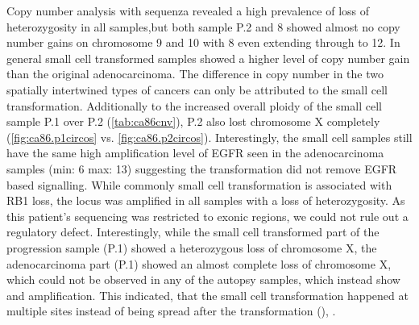 Copy number analysis with sequenza revealed a high prevalence of loss of heterozygosity in all samples,but both sample P.2 and 8 showed almost no copy number gains on chromosome 9 and 10 with 8 even extending through to 12. In general small cell transformed samples showed a higher level of copy number gain than the original adenocarcinoma. The difference in copy number in the two spatially intertwined types of cancers can only be attributed to the small cell transformation. Additionally to the increased overall ploidy of the small cell sample P.1 over P.2 (\autoref{tab:ca86cnv}), P.2 also lost chromosome X completely  (\autoref{fig:ca86.p1circos} vs. \autoref{fig:ca86.p2circos}). Interestingly, the small cell samples still have the same high amplification level of EGFR seen in the adenocarcinoma samples (min: 6 max: 13) suggesting the transformation did not remove EGFR based signalling. While commonly small cell transformation is associated with RB1 loss, the locus was amplified in all samples with a loss of heterozygosity. As this patient's sequencing was restricted to exonic regions, we could not rule out a regulatory defect. Interestingly, while the small cell transformed part of the progression sample (P.1) showed a heterozygous loss of chromosome X, the adenocarcinoma part (P.1) showed an almost complete loss of chromosome X, which could not be observed in any of the autopsy samples, which instead show and amplification. This indicated, that the small cell transformation happened at multiple sites instead of being spread after the transformation (), .

